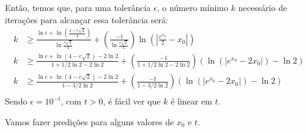 \documentclass{article}
\begin{document}
    Então, temos que, para uma tolerância $\epsilon$, o número mínimo $k$ necessário de iterações para alcançar essa tolerância será:
    \begin{align*}
        k &\geq \frac{\ln \epsilon + \ln(\frac{4 - e\sqrt{2}}{4})}{\ln \frac{e\sqrt{2}}{4}} +
        \left(\frac{-1}{\ln \frac{e\sqrt{2}}{4}}\right){\ln(|\frac{e^{x_0}}{2} - x_0|)}\\
        k &\geq \frac{\ln \epsilon + \ln(4 - e\sqrt{2}) - 2\ln 2}{1 + 1/2 \ln 2 - 2 \ln 2} +
        \left(\frac{-1}{1 + 1/2 \ln 2 - 2 \ln 2}\right)(\ln(|e^{x_0} - 2x_0|) - \ln 2)\\
        k &\geq \frac{\ln \epsilon + \ln(4 - e\sqrt{2}) - 2\ln 2}{1 - 3/2 \ln 2} +
        \left(\frac{-1}{1 - 3/2 \ln 2}\right)(\ln(|e^{x_0} - 2x_0|) - \ln 2)\\
    \end{align*}
    Sendo $\epsilon = 10^{-t}$, com $t > 0$, é fácil ver que $k$ é linear em $t$.

    Vamos fazer predições para alguns valores de $x_0$ e $t$.
    
\end{document}
